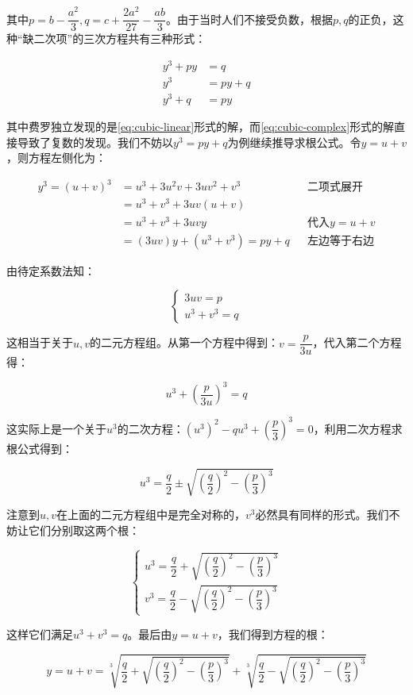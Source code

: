 \documentclass[b5paper]{ctexart}
\begin{document}
其中$p = b - \dfrac{a^2}{3}, q = c + \dfrac{2a^2}{27} - \dfrac{ab}{3}$。由于当时人们不接受负数，根据$p, q$的正负，这种“缺二次项”的三次方程共有三种形式：

\begin{align}
y^3 + py &= q \label{eq:cubic-linear} \\
     y^3 &= py + q \label{eq:cubic-complex} \\
y^3 + q &= py
\end{align}

其中费罗独立发现的是\cref{eq:cubic-linear}形式的解，而\cref{eq:cubic-complex}形式的解直接导致了复数的发现。我们不妨以$y^3 = py + q$为例继续推导求根公式。令$y = u + v$，则方程左侧化为：

\begin{align*}
y^3 = (u + v)^3 &= u^3 + 3u^2v + 3uv^2 + v^3 && \text{二项式展开} \\
  &= u^3 + v^3 + 3uv(u + v) \\
  &= u^3 + v^3 + 3uvy && \text{代入} y = u + v \\
  &= (3uv)y + (u^3 + v^3) = py + q && \text{左边等于右边}
\end{align*}

由待定系数法知：

\[
\begin{cases}
  3uv = p \\
  u^3 + v^3 = q
\end{cases}
\]

这相当于关于$u, v$的二元方程组。从第一个方程中得到：$v = \dfrac{p}{3u}$，代入第二个方程得：

\[
u^3 + (\frac{p}{3u})^3 = q
\]

这实际上是一个关于$u^3$的二次方程：$(u^3)^2 - qu^3 + (\dfrac{p}{3})^3 = 0$，利用二次方程求根公式得到：

\[
u^3 = \frac{q}{2} \pm \sqrt{(\frac{q}{2})^2 - (\frac{p}{3})^3}
\]

注意到$u, v$在上面的二元方程组中是完全对称的，$v^3$必然具有同样的形式。我们不妨让它们分别取这两个根：

\[
\begin{cases}
u^3 = \dfrac{q}{2} + \sqrt{(\dfrac{q}{2})^2 - (\dfrac{p}{3})^3} \\
v^3 = \dfrac{q}{2} - \sqrt{(\dfrac{q}{2})^2 - (\dfrac{p}{3})^3}
\end{cases}
\]

这样它们满足$u^3 + v^3 = q$。最后由$y = u + v$，我们得到方程的根：

\[
y = u + v = \sqrt[3]{\frac{q}{2} + \sqrt{(\frac{q}{2})^2 - (\frac{p}{3})^3}} + \sqrt[3]{\frac{q}{2} - \sqrt{(\frac{q}{2})^2 - (\frac{p}{3})^3}}
\]
\end{document}
